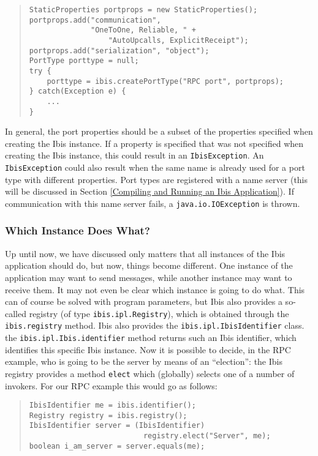 \documentclass[10pt]{article}
\newcommand{\mysubsubsection}[1]{\subsubsection{#1}\label{#1}}
\begin{document}
\begin{quote}
\begin{verbatim}
StaticProperties portprops = new StaticProperties();
portprops.add("communication",
              "OneToOne, Reliable, " + 
                  "AutoUpcalls, ExplicitReceipt");
portprops.add("serialization", "object");
PortType porttype = null;
try {
    porttype = ibis.createPortType("RPC port", portprops);
} catch(Exception e) {
    ...
}
\end{verbatim}
\end{quote}
\noindent
In general, the port properties should be a subset of the properties
specified when creating the Ibis instance. If a property is specified
that was not specified when creating the Ibis instance, this could
result in an \verb+IbisException+.
An \verb+IbisException+ could also result when the same name is
already used for a port type with different properties.
Port types are registered with a name server
(this will be discussed in Section \ref{Compiling and Running an Ibis Application}).
If communication with this name server fails, a
\verb+java.io.IOException+ is thrown.

\mysubsubsection{Which Instance Does What?}

Up until now, we have discussed only matters that all instances of
the Ibis application should do, but now, things become different.
One instance of the application may want to send messages, while
another instance may want to receive them.
It may not even be clear which instance is going to do what.
This can of course be solved with program parameters, but Ibis
also provides a so-called registry (of type
\verb+ibis.ipl.Registry+), which is obtained through the
\verb+ibis.registry+ method.
Ibis also provides the \verb+ibis.ipl.IbisIdentifier+ class.
the \verb+ibis.ipl.Ibis.identifier+ method returns such an
Ibis identifier, which identifies this specific Ibis instance.
Now it is possible to decide, in the RPC example, who is going
to be the server by means of an ``election'': the Ibis registry
provides a method \verb+elect+ which (globally) selects one of
a number of invokers.
For our RPC example this would go as follows:

\begin{quote}
\begin{verbatim}
IbisIdentifier me = ibis.identifier();
Registry registry = ibis.registry();
IbisIdentifier server = (IbisIdentifier)
                          registry.elect("Server", me);
boolean i_am_server = server.equals(me);
\end{verbatim}
\end{quote}
\end{document}
